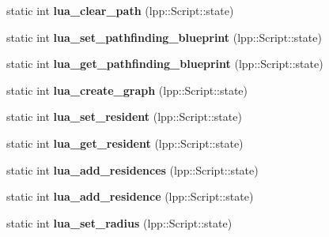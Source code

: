 \begin{DoxyCompactItemize}
\item 
static int {\bfseries lua\+\_\+clear\+\_\+path} (lpp\+::\+Script\+::state)\hypertarget{class_lua_interface_a4a8fc168f3459fb5bf2e215e8d7ccf11}{}\label{class_lua_interface_a4a8fc168f3459fb5bf2e215e8d7ccf11}

\item 
static int {\bfseries lua\+\_\+set\+\_\+pathfinding\+\_\+blueprint} (lpp\+::\+Script\+::state)\hypertarget{class_lua_interface_a9bada61e30e90909e7ad1a9c4a4d89c4}{}\label{class_lua_interface_a9bada61e30e90909e7ad1a9c4a4d89c4}

\item 
static int {\bfseries lua\+\_\+get\+\_\+pathfinding\+\_\+blueprint} (lpp\+::\+Script\+::state)\hypertarget{class_lua_interface_a0f1921f0b9f32755b4f13e552fff114e}{}\label{class_lua_interface_a0f1921f0b9f32755b4f13e552fff114e}

\item 
static int {\bfseries lua\+\_\+create\+\_\+graph} (lpp\+::\+Script\+::state)\hypertarget{class_lua_interface_adbadc8aa461ebdacc7157616945a337a}{}\label{class_lua_interface_adbadc8aa461ebdacc7157616945a337a}

\item 
static int {\bfseries lua\+\_\+set\+\_\+resident} (lpp\+::\+Script\+::state)\hypertarget{class_lua_interface_a508a1bf98b0a7858d94c3d8508b8ec1e}{}\label{class_lua_interface_a508a1bf98b0a7858d94c3d8508b8ec1e}

\item 
static int {\bfseries lua\+\_\+get\+\_\+resident} (lpp\+::\+Script\+::state)\hypertarget{class_lua_interface_afccc1d3f54e742ae03a00d1122d4f3d4}{}\label{class_lua_interface_afccc1d3f54e742ae03a00d1122d4f3d4}

\item 
static int {\bfseries lua\+\_\+add\+\_\+residences} (lpp\+::\+Script\+::state)\hypertarget{class_lua_interface_a5ab0aa576b72ecb2c5c8e3d3ee0581f1}{}\label{class_lua_interface_a5ab0aa576b72ecb2c5c8e3d3ee0581f1}

\item 
static int {\bfseries lua\+\_\+add\+\_\+residence} (lpp\+::\+Script\+::state)\hypertarget{class_lua_interface_a10945721639d41f40eb491527bac96c5}{}\label{class_lua_interface_a10945721639d41f40eb491527bac96c5}

\item 
static int {\bfseries lua\+\_\+set\+\_\+radius} (lpp\+::\+Script\+::state)\hypertarget{class_lua_interface_aabbc59e14ac27a56109a85be29f4bb35}{}\label{class_lua_interface_aabbc59e14ac27a56109a85be29f4bb35}


\end{DoxyCompactItemize}
